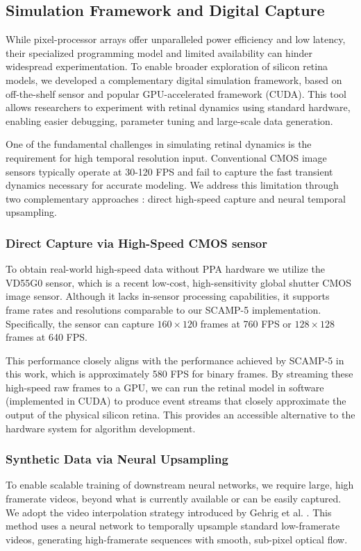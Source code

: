 \documentclass{article}
\begin{document}
\subsection{Simulation Framework and Digital Capture}
\label{sec:simulation}
While pixel-processor arrays offer unparalleled power efficiency and low latency, their specialized programming model and limited availability can hinder widespread experimentation. To enable broader exploration of silicon retina models, we developed a complementary digital simulation framework, based on off-the-shelf sensor and popular GPU-accelerated framework (CUDA). This tool allows researchers to experiment with retinal dynamics using standard hardware, enabling easier debugging, parameter tuning and large-scale data generation.

One of the fundamental challenges in simulating retinal dynamics is the requirement for high temporal resolution input. Conventional CMOS image sensors typically operate at 30-120 FPS and fail to capture the fast transient dynamics necessary for accurate modeling. We address this limitation through two complementary approaches : direct high-speed capture and neural temporal upsampling.

\subsubsection{Direct Capture via High-Speed CMOS sensor}
To obtain real-world high-speed data without PPA hardware we utilize the VD55G0 sensor, which is a recent low-cost, high-sensitivity global shutter CMOS image sensor. Although it lacks in-sensor processing capabilities, it supports frame rates and resolutions comparable to our SCAMP-5 implementation. Specifically, the sensor can capture $160 \times 120$ frames at 760 FPS or $128 \times128$ frames at 640 FPS.

This performance closely aligns with the performance achieved by SCAMP-5 in this work, which is approximately 580 FPS for binary frames. By streaming these high-speed raw frames to a GPU, we can run the retinal model in software (implemented in CUDA) to produce event streams that closely approximate the output of the physical silicon retina. This provides an accessible alternative to the hardware system for algorithm development.

\subsubsection{Synthetic Data via Neural Upsampling}
\label{ref:neural_upsampling}
To enable scalable training of downstream neural networks, we require large, high framerate videos, beyond what is currently available or can be easily captured. We adopt the video interpolation strategy introduced by Gehrig et al. \cite{gehrig_video_2020}. This method uses a neural network to temporally upsample standard low-framerate videos, generating high-framerate sequences with smooth, sub-pixel optical flow. 
\end{document}
